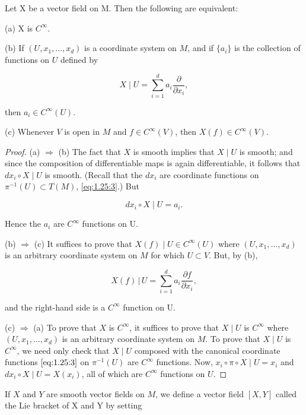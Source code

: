 \begin{proposition}\label{thm:1.43}
	Let X be a vector field on M. Then the following are equivalent:

	(a) X is  $ C^{\infty} $.

	(b) If $(U, x_{1}, \ldots, x_{d})$ is a coordinate system on $M$, and if $\{a_{i}\}$ is the collection of functions on $U$ defined by

	\[
		X\mid U=\sum_{i=1}^{d}a_{i}\frac{\partial}{\partial x_{i}},
	\]

	then  $ a_{i} \in C^{\infty}(U) $.

	(c) Whenever $V$ is open in $M$ and $f\in C^{\infty}(V)$, then $X(f)\in C^{\infty}(V)$.

\end{proposition}

\begin{proof}
	(a) $\Rightarrow$ (b) The fact that $X$ is smooth implies that $X \mid U$ is smooth; and since the composition of differentiable maps is again differentiable, it follows that $dx_i \circ X \mid U$ is smooth. (Recall that the $dx_i$ are coordinate functions on $\pi^{-1}(U) \subset T(M)$, \eqref{eq:1.25:3}.) But 

	\[
		d x_{i}\circ X\mid U=a_{i}.
	\]

	Hence the  $ a_{i} $ are  $ C^{\infty} $ functions on U.

	(b) $\Rightarrow$ (c) It suffices to prove that $X(f) \mid U \in C^{\infty}(U)$ where $(U, x_{1}, \ldots, x_{d})$ is an arbitrary coordinate system on $M$ for which $U \subset V$. But, by (b),

	\[
		X(f)\,|\,U=\sum_{i=1}^{d}a_{i}\frac{\partial f}{\partial x_{i}},
	\]

	and the right-hand side is a  $ C^{\infty} $ function on U.

	(c) $\Rightarrow$ (a) To prove that $X$ is $C^{\infty}$, it suffices to prove that $X\mid U$ is $C^{\infty}$ where $(U, x_1, \ldots, x_d)$ is an arbitrary coordinate system on $M$. To prove that $X\mid U$ is $C^{\infty}$, we need only check that $X\mid U$ composed with the canonical coordinate functions $\eqref{eq:1.25:3}$ on $\pi^{-1}(U)$ are $C^{\infty}$ functions. Now, $x_i \circ \pi \circ X\mid U = x_i$ and $dx_i \circ X\mid U = X(x_i)$, all of which are $C^{\infty}$ functions on $U$.
\end{proof}

\label{thm:1.44}
If $X$ and $Y$ are smooth vector fields on $M$, we define a vector field  $ [X,Y] $ called the Lie bracket of X and Y by setting 

